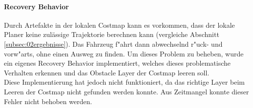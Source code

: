 \paragraph{Recovery Behavior}
Durch Artefakte in der lokalen Costmap kann es vorkommen, dass der lokale Planer keine zul\"assige Trajektorie berechnen kann (vergleiche Abschnitt \ref{subsec:02ergebnisse}). Das Fahrzeug f"ahrt dann abwechselnd r"uck- und vorw"arts, ohne einen Ausweg zu finden. Um dieses Problem zu beheben, wurde ein eigenes Recovery Behavior implementiert, welches dieses problematische Verhalten erkennen und das Obstacle Layer der Costmap leeren soll.\\
Diese Implementierung hat jedoch nicht funktioniert, da das richtige Layer beim Leeren der Costmap nicht gefunden werden konnte. Aus Zeitmangel konnte dieser Fehler nicht behoben werden.